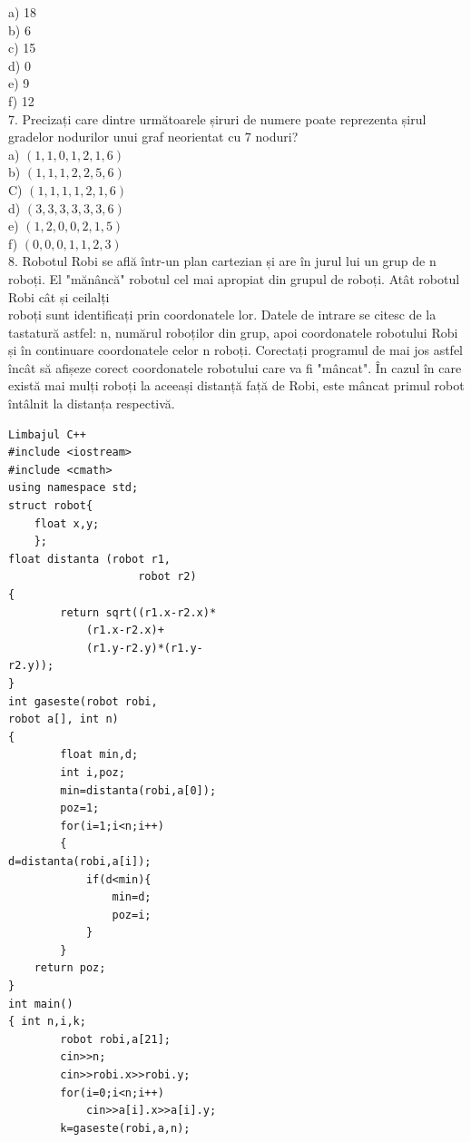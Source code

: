 \documentclass[10pt]{article}
\begin{document}
a) 18\\
b) 6\\
c) 15\\
d) 0\\
e) 9\\
f) 12\\
7. Precizați care dintre următoarele șiruri de numere poate reprezenta șirul gradelor nodurilor unui graf neorientat cu 7 noduri?\\
a) $(1,1,0,1,2,1,6)$\\
b) $(1,1,1,2,2,5,6)$\\
C) $(1,1,1,1,2,1,6)$\\
d) $(3,3,3,3,3,3,6)$\\
e) $(1,2,0,0,2,1,5)$\\
f) $(0,0,0,1,1,2,3)$\\
8. Robotul Robi se află într-un plan cartezian și are în jurul lui un grup de n roboți. El "mănâncă" robotul cel mai apropiat din grupul de roboți. Atât robotul Robi cât și ceilalți\\
roboți sunt identificați prin coordonatele lor. Datele de intrare se citesc de la tastatură astfel: n, numărul roboților din grup, apoi coordonatele robotului Robi și în continuare coordonatele celor n roboți. Corectați programul de mai jos astfel încât să afișeze corect coordonatele robotului care va fi "mâncat". În cazul în care există mai mulți roboți la aceeași distanță față de Robi, este mâncat primul robot întâlnit la distanța respectivă.

\begin{verbatim}
Limbajul C++
#include <iostream>
#include <cmath>
using namespace std;
struct robot{
    float x,y;
    };
float distanta (robot r1,
                    robot r2)
{
        return sqrt((r1.x-r2.x)*
            (r1.x-r2.x)+
            (r1.y-r2.y)*(r1.y-
r2.y));
}
int gaseste(robot robi,
robot a[], int n)
{
        float min,d;
        int i,poz;
        min=distanta(robi,a[0]);
        poz=1;
        for(i=1;i<n;i++)
        {
d=distanta(robi,a[i]);
            if(d<min){
                min=d;
                poz=i;
            }
        }
    return poz;
}
int main()
{ int n,i,k;
        robot robi,a[21];
        cin>>n;
        cin>>robi.x>>robi.y;
        for(i=0;i<n;i++)
            cin>>a[i].x>>a[i].y;
        k=gaseste(robi,a,n);
\end{verbatim}
\end{document}
